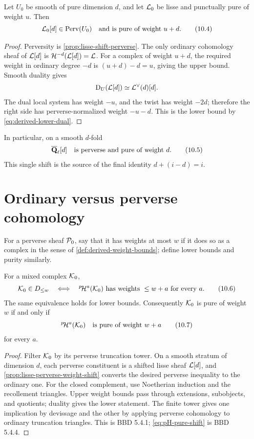 \begin{proposition}
\label{prop:lisse-perverse-weight-shift}
Let \(U_0\) be smooth of pure dimension \(d\), and let \(\mathcal L_0\) be lisse and
punctually pure of weight \(u\).  Then
\[
  \mathcal L_0[d]\in\operatorname{Perv}(U_0)
  \quad\text{and is pure of weight }u+d.
\tag{10.4}\label{eq:lisse-perverse-weight}
\]
\end{proposition}

\begin{proof}
Perversity is \cref{prop:lisse-shift-perverse}.  The only ordinary
cohomology sheaf of \(\mathcal L[d]\) is
\(\mathcal H^{-d}(\mathcal L[d])=\mathcal L\).  For a complex of weight \(u+d\), the required
weight in ordinary degree \(-d\) is \((u+d)-d=u\), giving the upper bound.
Smooth duality gives
\[
  \mathrm D_U(\mathcal L[d])\simeq\mathcal L^\vee(d)[d].
\]
The dual local system has weight \(-u\), and the twist has weight \(-2d\);
therefore the right side has perverse-normalized weight \(-u-d\).  This is the
lower bound by \eqref{eq:derived-lower-dual}.
\end{proof}

In particular, on a smooth \(d\)-fold
\[
  \overline{\mathbf Q}_\ell[d]\quad\text{is perverse and pure of weight }d.
\tag{10.5}\label{eq:constant-perverse-weight}
\]
This single shift is the source of the final identity
\(d+(i-d)=i\).

\section{Ordinary versus perverse cohomology}

For a perverse sheaf \(\mathcal P_0\), say that it has weights at most \(w\) if it
does so as a complex in the sense of \cref{def:derived-weight-bounds};
define lower bounds and purity similarly.

\begin{theorem}
\label{thm:perverse-weight-criterion}
For a mixed complex \(\mathcal K_0\),
\[
 \mathcal K_0\in D_{\leq w}
 \quad\Longleftrightarrow\quad
 {}^{p}\!\mathcal H^a(\mathcal K_0)\text{ has weights }\leq w+a
 \text{ for every }a.
\tag{10.6}\label{eq:perverse-upper-equivalence}
\]
The same equivalence holds for lower bounds.  Consequently \(\mathcal K_0\) is pure
of weight \(w\) if and only if
\[
  {}^{p}\!\mathcal H^a(\mathcal K_0)\quad\text{is pure of weight }w+a
\tag{10.7}\label{eq:pH-pure-shift}
\]
for every \(a\).
\end{theorem}

\begin{proof}
Filter \(\mathcal K_0\) by its perverse truncation tower.  On a smooth stratum of
dimension \(d\), each perverse constituent is a shifted lisse sheaf
\(\mathcal L[d]\), and \cref{prop:lisse-perverse-weight-shift} converts the desired
perverse inequality to the ordinary one.  For the closed complement, use
Noetherian induction and the recollement triangles.  Upper weight bounds pass
through extensions, subobjects, and quotients; duality gives the lower
statement.  The finite tower gives one implication by devissage and the other
by applying perverse cohomology to ordinary truncation triangles.  This is BBD
5.4.1; \eqref{eq:pH-pure-shift} is BBD 5.4.4.
\end{proof}

